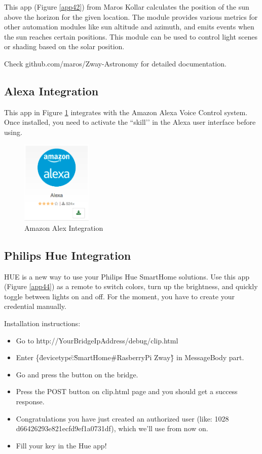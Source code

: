 This app (Figure \ref{app42}) from  Maros Kollar calculates the position 
of the sun above the horizon for the given location. The module provides various metrics 
for other automation modules like sun altitude and azimuth, and emits events when the sun 
reaches certain positions. This module can be used to control light scenes or shading 
based on the solar position.

Check github.com/maros/Zway-Astronomy for detailed documentation.


\subsection{Alexa Integration}

This app in Figure \ref{app43} integrates \zway with the Amazon Alexa Voice Control system. 
Once installed, you need to activate the ``skill’’ in the Alexa user interface before using.

\begin{figure}
\begin{center}
\includegraphics[width=0.3\textwidth]{pngs/cap6/app43.png}
\caption{Amazon Alex Integration}
\label{app43}
\end{center}
\end{figure}

\subsection{Philips Hue Integration}


HUE is a new way to use your Philips Hue SmartHome solutions. Use this app (Figure \ref{app44}) 
as a remote to  switch colors, turn up the brightness, and quickly toggle between lights on 
and off. For the moment, you have to create your credential manually.

Installation instructions:

\begin{itemize}
\item Go to http://YourBridgeIpAddress/debug/clip.html
\item Enter \{\"devicetype\":\"SmartHome\#RasberryPi Zway\"\} in MessageBody part.
\item Go and press the button on the bridge.
\item Press the POST button on clip.html page and you should get a success response.
\item Congratulations you have just created an authorized user (like: 1028 d66426293e821ecfd9ef1a0731df), which we’ll use from now on.
\item Fill your key in the Hue app!
\end{itemize}

